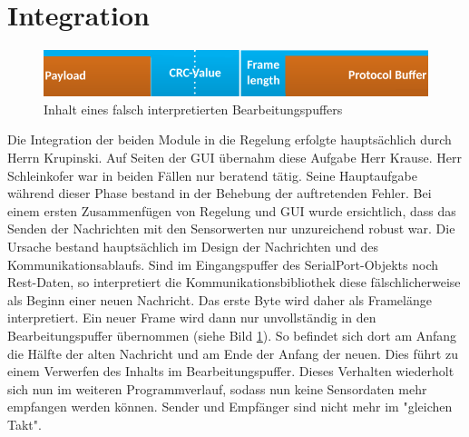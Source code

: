 \section{Integration}
\begin{figure}
  \includegraphics[width=\textwidth]{WorkBufferFail}
  \caption{Inhalt eines falsch interpretierten Bearbeitungspuffers}
  \label{fig:FrameFail}
\end{figure}
Die Integration der beiden Module in die Regelung erfolgte hauptsächlich durch Herrn Krupinski. Auf Seiten der GUI übernahm diese Aufgabe Herr Krause. Herr Schleinkofer war in beiden Fällen nur beratend tätig. Seine Hauptaufgabe während dieser Phase bestand in der Behebung der auftretenden Fehler. Bei einem ersten Zusammenfügen von Regelung und GUI wurde ersichtlich, dass das Senden der Nachrichten mit den Sensorwerten nur unzureichend robust war. Die Ursache bestand hauptsächlich im Design der Nachrichten und des Kommunikationsablaufs. Sind im Eingangspuffer des SerialPort-Objekts noch Rest-Daten, so interpretiert die Kommunikationsbibliothek diese fälschlicherweise als Beginn einer neuen Nachricht. Das erste Byte wird daher als Framelänge interpretiert. Ein neuer Frame wird dann nur unvollständig in den Bearbeitungspuffer übernommen (siehe Bild \ref{fig:FrameFail}). So befindet sich dort am Anfang die Hälfte der alten Nachricht und am Ende der Anfang der neuen. Dies führt zu einem Verwerfen des Inhalts im Bearbeitungspuffer. Dieses Verhalten wiederholt sich nun im weiteren Programmverlauf, sodass nun keine Sensordaten mehr empfangen werden können. Sender und Empfänger sind nicht mehr im "gleichen Takt". 
